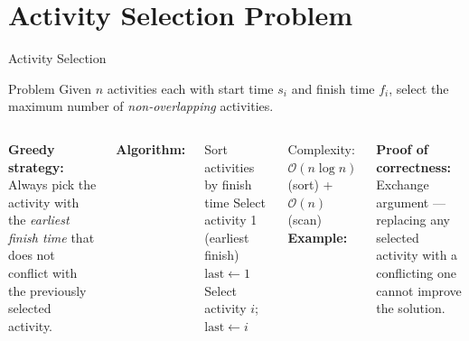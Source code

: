 \documentclass[aspectratio=169]{beamer}
\begin{document}
\section{Activity Selection Problem}

\begin{frame}[shrink=25]{Activity Selection}
  \begin{block}{Problem}
    Given $n$ activities each with start time $s_i$ and finish time $f_i$,
    select the maximum number of \emph{non-overlapping} activities.
  \end{block}
  \vspace{0.3em}
  \begin{columns}[T]
      \textbf{Greedy strategy:} Always pick the activity with the
      \emph{earliest finish time} that does not conflict with the
      previously selected activity.

      \vspace{0.3em}
      \textbf{Algorithm:}
      \begin{algorithmic}[1]
        \State Sort activities by finish time
        \State Select activity 1 (earliest finish)
        \State $\text{last} \gets 1$
            \State Select activity $i$;\; $\text{last} \gets i$
          \EndIf
        \EndFor
      \end{algorithmic}
      Complexity: $\mathcal{O}(n\log n)$ (sort) + $\mathcal{O}(n)$ (scan)
      \textbf{Example:}
      \vspace{0.2em}

      \vspace{0.3em}
      \textbf{Proof of correctness:} Exchange argument — replacing any
      selected activity with a conflicting one cannot improve the solution.
  \end{columns}
\end{frame}
\end{document}
